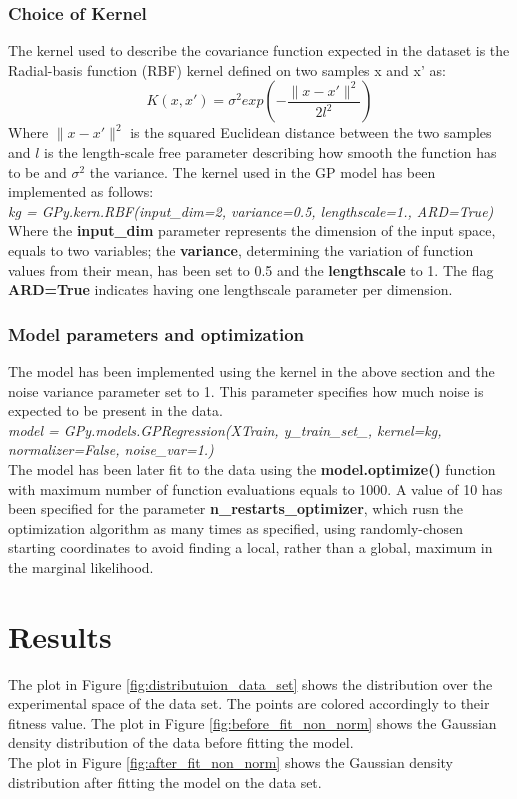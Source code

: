 \documentclass[a4paper]{article}
\begin{document}
\subsubsection{Choice of Kernel}
The kernel used to describe the covariance function expected in the dataset is the Radial-basis function (RBF) kernel defined on two samples x and x' as: 
\begin{equation}
	K({ x },{ x' })=\sigma ^{ 2 }exp\left( -{ \frac { \| { x }-{ x' }\| ^{ 2 } }{ 2l ^{ 2 } }  } \right)
\end{equation}
Where $\| { x }-{ x' }\| ^{ 2 }$ is the squared Euclidean distance between the two samples and $l$ is the length-scale free parameter describing how smooth the function has to be and $\sigma ^{ 2 }$ the variance. 
The kernel used in the GP model has been implemented as follows:
{
	\\\textit{kg = GPy.kern.RBF(input\_dim=2, variance=0.5, lengthscale=1., ARD=True)}
}
Where the \textbf{input\_dim} parameter represents the dimension of the input space, equals to two variables; the \textbf{variance}, determining the variation of function values from their mean, has been set to 0.5 and the \textbf{lengthscale} to 1. The flag \textbf{ARD=True} indicates having one lengthscale parameter per dimension.

\subsubsection{Model parameters and optimization}
The model has been implemented using the kernel in the above section and the noise variance parameter set to 1. This parameter specifies how much noise is expected to be present in the data.
{
\\\textit{model = GPy.models.GPRegression(XTrain, y\_train\_set\_, kernel=kg, normalizer=False, noise\_var=1.)}
}
\\The model has been later fit to the data using the 
\textbf{model.optimize()} function with maximum number of function evaluations equals to 1000. 
A value of 10 has been specified for the parameter \textbf{n\_restarts\_optimizer}, which rusn the optimization algorithm as many times as specified, using randomly-chosen starting coordinates to avoid finding a local, rather than a global, maximum in the marginal likelihood.

\section{Results}
The plot in Figure \ref{fig:distributuion_data_set} shows the distribution over the experimental space of the data set. The points are colored accordingly to their fitness value.
The plot in Figure \ref{fig:before_fit_non_norm} shows the Gaussian density distribution of the data before fitting the model. 
\\The plot in Figure \ref{fig:after_fit_non_norm} shows the Gaussian density distribution after fitting the model on the data set. 
\end{document}
